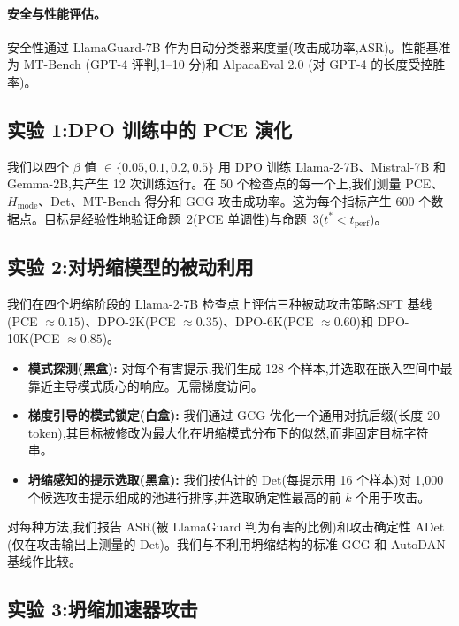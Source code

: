 \paragraph{安全与性能评估。} 安全性通过 LlamaGuard-7B \citep{inan2023llama} 作为自动分类器来度量(攻击成功率,ASR)。性能基准为 MT-Bench \citep{zheng2023judging}(GPT-4 评判,1--10 分)和 AlpacaEval 2.0 \citep{li2023alpacaeval}(对 GPT-4 的长度受控胜率)。

\subsection{实验 1:DPO 训练中的 PCE 演化}
\label{sec:exp1}

我们以四个 $\beta$ 值 $\in \{0.05, 0.1, 0.2, 0.5\}$ 用 DPO 训练 Llama-2-7B、Mistral-7B 和 Gemma-2B,共产生 12 次训练运行。在 50 个检查点的每一个上,我们测量 PCE、$H_{\text{mode}}$、Det、MT-Bench 得分和 GCG 攻击成功率。这为每个指标产生 600 个数据点。目标是经验性地验证命题~2(PCE 单调性)与命题~3($t^* < t_{\text{perf}}$)。

\subsection{实验 2:对坍缩模型的被动利用}
\label{sec:exp2}

我们在四个坍缩阶段的 Llama-2-7B 检查点上评估三种被动攻击策略:SFT 基线(PCE $\approx 0.15$)、DPO-2K(PCE $\approx 0.35$)、DPO-6K(PCE $\approx 0.60$)和 DPO-10K(PCE $\approx 0.85$)。

\begin{itemize}[leftmargin=*,nosep]
    \item \textbf{模式探测(黑盒):} 对每个有害提示,我们生成 128 个样本,并选取在嵌入空间中最靠近主导模式质心的响应。无需梯度访问。
    \item \textbf{梯度引导的模式锁定(白盒):} 我们通过 GCG \citep{zou2023universal} 优化一个通用对抗后缀(长度 20 token),其目标被修改为最大化在坍缩模式分布下的似然,而非固定目标字符串。
    \item \textbf{坍缩感知的提示选取(黑盒):} 我们按估计的 Det(每提示用 16 个样本)对 1{,}000 个候选攻击提示组成的池进行排序,并选取确定性最高的前 $k$ 个用于攻击。
\end{itemize}

\noindent 对每种方法,我们报告 ASR(被 LlamaGuard 判为有害的比例)和攻击确定性 $\text{ADet}$(仅在攻击输出上测量的 Det)。我们与不利用坍缩结构的标准 GCG 和 AutoDAN \citep{liu2023autodan} 基线作比较。

\subsection{实验 3:坍缩加速器攻击}
\label{sec:exp3}

